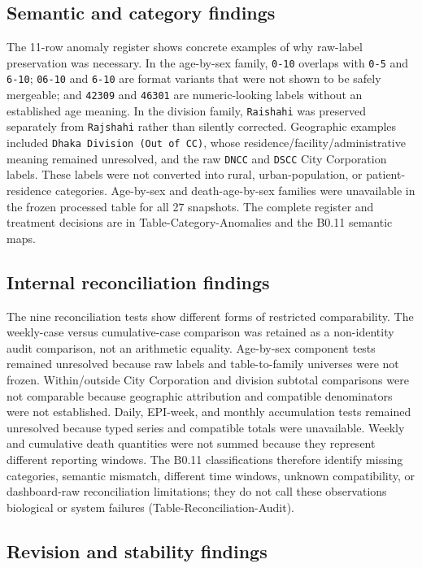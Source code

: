 \subsection{Semantic and category findings}

The 11-row anomaly register shows concrete examples of why raw-label preservation was necessary. In the age-by-sex family, \texttt{0-10} overlaps with \texttt{0-5} and \texttt{6-10}; \texttt{06-10} and \texttt{6-10} are format variants that were not shown to be safely mergeable; and \texttt{42309} and \texttt{46301} are numeric-looking labels without an established age meaning. In the division family, \texttt{Raishahi} was preserved separately from \texttt{Rajshahi} rather than silently corrected. Geographic examples included \texttt{Dhaka Division (Out of CC)}, whose residence/facility/administrative meaning remained unresolved, and the raw \texttt{DNCC} and \texttt{DSCC} City Corporation labels. These labels were not converted into rural, urban-population, or patient-residence categories. Age-by-sex and death-age-by-sex families were unavailable in the frozen processed table for all 27 snapshots. The complete register and treatment decisions are in Table-Category-Anomalies and the B0.11 semantic maps.

\subsection{Internal reconciliation findings}

The nine reconciliation tests show different forms of restricted comparability. The weekly-case versus cumulative-case comparison was retained as a non-identity audit comparison, not an arithmetic equality. Age-by-sex component tests remained unresolved because raw labels and table-to-family universes were not frozen. Within/outside City Corporation and division subtotal comparisons were not comparable because geographic attribution and compatible denominators were not established. Daily, EPI-week, and monthly accumulation tests remained unresolved because typed series and compatible totals were unavailable. Weekly and cumulative death quantities were not summed because they represent different reporting windows. The B0.11 classifications therefore identify missing categories, semantic mismatch, different time windows, unknown compatibility, or dashboard-raw reconciliation limitations; they do not call these observations biological or system failures (Table-Reconciliation-Audit).

\subsection{Revision and stability findings}

